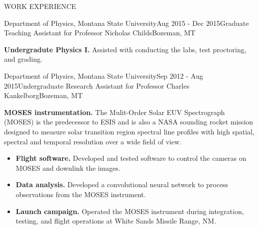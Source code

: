 \documentclass{resume} %
\begin{document}
\begin{rSection}{WORK EXPERIENCE}
\begin{rSubsection}{Department of Physics, Montana State University}{Aug 2015 - Dec 2015}{Graduate Teaching Assistant for Professor Nicholas Childs}{Bozeman, MT}
	\small
	\item \textbf{Undergradute Physics I.} Assisted with conducting the labs, test proctoring, and grading.
\end{rSubsection}

\begin{rSubsection}{Department of Physics, Montana State University}{Sep 2012 - Aug 2015}{Undergraduate Research Assistant for Professor Charles Kankelborg}{Bozeman, MT}
	\small
	\item \textbf{MOSES instrumentation.} The Mulit-Order Solar EUV Spectrograph (MOSES) is the predecessor to ESIS and is also a NASA sounding rocket mission designed to measure solar transition region spectral line profiles with high spatial, spectral and temporal resolution over a wide field of view.
	\begin{itemize}[topsep=-5pt, noitemsep, leftmargin=*, label={--}]
		\item \textbf{Flight software.} Developed and tested software to control the cameras on MOSES and downlink the images.
		\item \textbf{Data analysis.} Developed a convolutional neural network to process observations from the MOSES instrument.
		\item \textbf{Launch campaign.} Operated the MOSES instrument during integration, testing, and flight operations at White Sands Missile Range, NM.
	\end{itemize}
\end{rSubsection}


\newpage
	
\end{rSection} 
\end{document}
